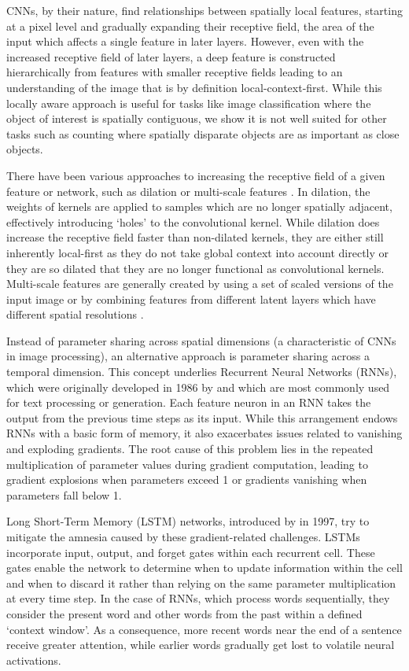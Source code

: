 \documentclass[../thesis.tex]{subfiles}
\begin{document}
CNNs, by their nature, find relationships between spatially local features, starting at a pixel level and gradually expanding their receptive field, the area of the input which affects a single feature in later layers. 
However, even with the increased receptive field of later layers, a deep feature is constructed hierarchically from features with smaller receptive fields leading to an understanding of the image that is by definition local-context-first.
While this locally aware approach is useful for tasks like image classification where the object of interest is spatially contiguous, we show it is not well suited for other tasks such as counting where spatially disparate objects are as important as close objects.

There have been various approaches to increasing the receptive field of a given feature or network, such as dilation \cite{li2018csrnet, bai2020adaptive} or multi-scale features \cite{ranjan2021Famnet}. 
In dilation, the weights of kernels are applied to samples which are no longer spatially adjacent, effectively introducing `holes' to the convolutional kernel. While dilation does increase the receptive field faster than non-dilated kernels, they are either still inherently local-first as they do not take global context into account directly or they are so dilated that they are no longer functional as convolutional kernels.
Multi-scale features are generally created by using a set of scaled versions of the input image or by combining features from different latent layers which have different spatial resolutions \cite{gao2019res2net,olimov2023consecutive}.


Instead of parameter sharing across spatial dimensions (a characteristic of CNNs in image processing), an alternative approach is parameter sharing across a temporal dimension. This concept underlies Recurrent Neural Networks (RNNs), which were originally developed in 1986 by \citet{rumelhart1986learning} and which are most commonly used for text processing or generation.
Each feature neuron in an RNN takes the output from the previous time steps as its input. 
While this arrangement endows RNNs with a basic form of memory, it also exacerbates issues related to vanishing and exploding gradients. The root cause of this problem lies in the repeated multiplication of parameter values during gradient computation, leading to gradient explosions when parameters exceed 1 or gradients vanishing when parameters fall below 1.

Long Short-Term Memory (LSTM) networks, introduced by \citet{hochreiter1997long} in 1997, try to mitigate the amnesia caused by these gradient-related challenges. LSTMs incorporate input, output, and forget gates within each recurrent cell. These gates enable the network to determine when to update information within the cell and when to discard it rather than relying on the same parameter multiplication at every time step. 
In the case of RNNs, which process words sequentially, they consider the present word and other words from the past within a defined `context window'. As a consequence, more recent words near the end of a sentence receive greater attention, while earlier words gradually get lost to volatile neural activations.
\end{document}
